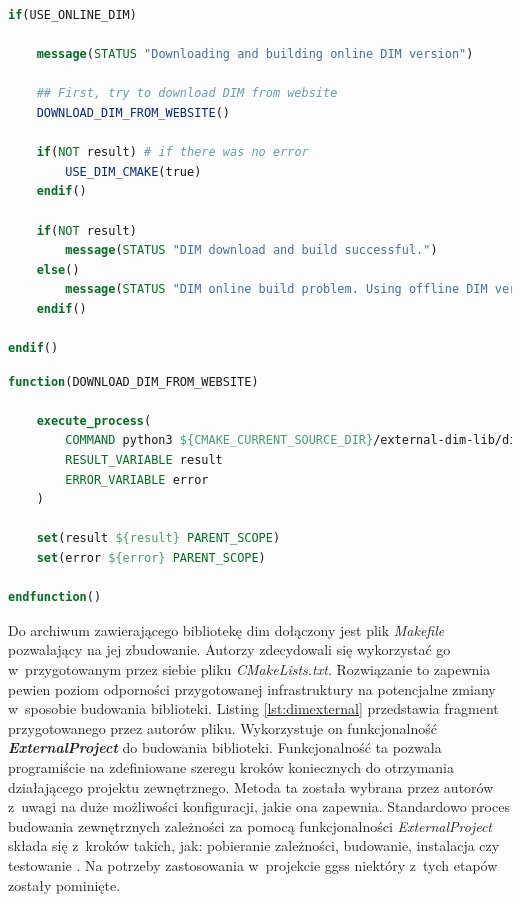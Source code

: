 \begin{lstlisting}[language=cmake, caption={Fragment pliku \textit{dim\_build.cmake} przedstawiający proces budowania nowej, pobranej ze strony internetowej wersji biblioteki \gls*{dim}. Widoczne wywołania zdefiniowanych przez autorów funkcji. }, label={lst:dimonlinebuild}]
if(USE_ONLINE_DIM)

    message(STATUS "Downloading and building online DIM version")

    ## First, try to download DIM from website
    DOWNLOAD_DIM_FROM_WEBSITE()

    if(NOT result) # if there was no error
        USE_DIM_CMAKE(true)
    endif()

    if(NOT result)
        message(STATUS "DIM download and build successful.")
    else()
        message(STATUS "DIM online build problem. Using offline DIM version.")
    endif()

endif()
\end{lstlisting}

\newpage

\begin{lstlisting}[language=cmake, caption={Przykład funkcji zdefiniowanej w~skrypcie \gls*{cmake}. Funkcja wykorzystuje komendę \lstinline{execute_process} w celu wykonania skryptu pobierającego bibliotekę \gls*{dim} z~oficjalnej strony internetowej.}, label={lst:dimdown}]
function(DOWNLOAD_DIM_FROM_WEBSITE)

    execute_process(
        COMMAND python3 ${CMAKE_CURRENT_SOURCE_DIR}/external-dim-lib/dim_download.py
        RESULT_VARIABLE result
        ERROR_VARIABLE error
    )

    set(result ${result} PARENT_SCOPE)
    set(error ${error} PARENT_SCOPE)

endfunction()
\end{lstlisting}

Do archiwum zawierającego bibliotekę \gls*{dim} dołączony jest plik \textit{Makefile} pozwalający na jej zbudowanie. Autorzy zdecydowali się wykorzystać go w~przygotowanym przez siebie pliku \textit{CMakeLists.txt}. Rozwiązanie to zapewnia pewien poziom odporności przygotowanej infrastruktury na potencjalne zmiany w~sposobie budowania biblioteki. Listing \ref{lst:dimexternal} przedstawia fragment przygotowanego przez autorów pliku. Wykorzystuje on funkcjonalność \textit{\textbf{ExternalProject}} do budowania biblioteki. Funkcjonalność ta pozwala programiście na zdefiniowane szeregu kroków koniecznych do otrzymania działającego projektu zewnętrznego. Metoda ta została wybrana przez autorów z~uwagi na duże możliwości konfiguracji, jakie ona zapewnia. Standardowo proces budowania zewnętrznych zależności za pomocą funkcjonalności \textit{ExternalProject} składa się z~kroków takich, jak: pobieranie zależności, budowanie, instalacja czy testowanie \cite{CMakeExternalProject}. Na potrzeby zastosowania w~projekcie \gls*{ggss} niektóry z~tych etapów zostały pominięte. 


